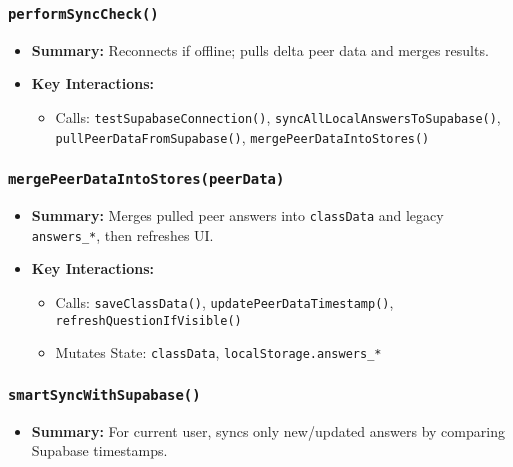 \documentclass[11pt,letterpaper]{article}
\begin{document}
\subsubsection{\texttt{performSyncCheck()}}
\begin{itemize}
    \item \textbf{Summary:} Reconnects if offline; pulls delta peer data and merges results.
    \item \textbf{Key Interactions:}
    \begin{itemize}
        \item Calls: \texttt{testSupabaseConnection()}, \texttt{syncAllLocalAnswersToSupabase()}, \texttt{pullPeerDataFromSupabase()}, \texttt{mergePeerDataIntoStores()}
    \end{itemize}
\end{itemize}

\subsubsection{\texttt{mergePeerDataIntoStores(peerData)}}
\begin{itemize}
    \item \textbf{Summary:} Merges pulled peer answers into \texttt{classData} and legacy \texttt{answers\_*}, then refreshes UI.
    \item \textbf{Key Interactions:}
    \begin{itemize}
        \item Calls: \texttt{saveClassData()}, \texttt{updatePeerDataTimestamp()}, \texttt{refreshQuestionIfVisible()}
        \item Mutates State: \texttt{classData}, \texttt{localStorage.answers\_*}
    \end{itemize}
\end{itemize}

\subsubsection{\texttt{smartSyncWithSupabase()}}
\begin{itemize}
    \item \textbf{Summary:} For current user, syncs only new/updated answers by comparing Supabase timestamps.
\end{itemize}
\end{document}
